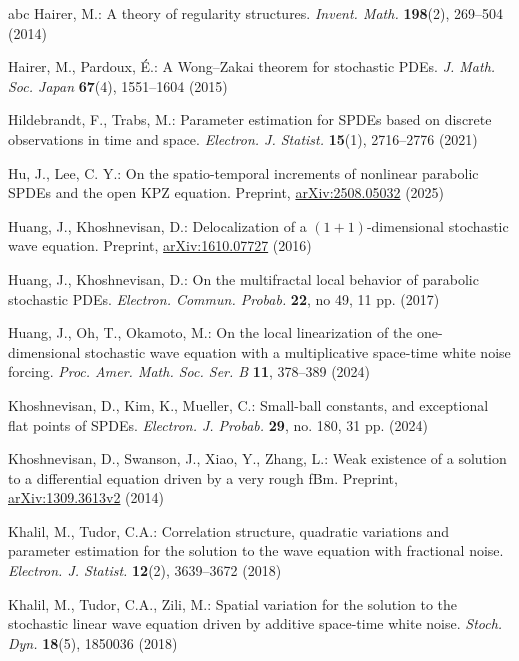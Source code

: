 \documentclass[11pt,reqno]{amsart}
\numberwithin{equation}{section}
\newcommand{\1}{{\bf 1}}
\newcommand{\2}{{\bf 2}}
\begin{document}
\begin{thebibliography}{abc}
Hairer, M.: A theory of regularity structures. \textit{Invent. Math.} \textbf{198}(2), 269--504 (2014)

Hairer, M., Pardoux, \'E.: A Wong–Zakai theorem for stochastic PDEs. \textit{J. Math. Soc. Japan} \textbf{67}(4), 1551--1604 (2015)

Hildebrandt, F., Trabs, M.: Parameter estimation for SPDEs based on discrete observations in time and space. 
\textit{Electron. J. Statist.} \textbf{15}(1), 2716--2776 (2021)

Hu, J., Lee, C. Y.: On the spatio-temporal increments of nonlinear parabolic SPDEs and the open KPZ equation. 
Preprint, \href{https://arxiv.org/pdf/2508.05032}{arXiv:2508.05032} (2025)

Huang, J., Khoshnevisan, D.: Delocalization of a $(1+1)$-dimensional stochastic wave equation. 
Preprint, \href{https://arxiv.org/abs/1610.07727}{arXiv:1610.07727} (2016)

Huang, J., Khoshnevisan, D.: On the multifractal local behavior of parabolic stochastic PDEs. 
\textit{Electron. Commun. Probab.} \textbf{22}, no 49, 11 pp. (2017)

Huang, J., Oh, T., Okamoto, M.: On the local linearization of the one-dimensional stochastic wave equation with a multiplicative space-time white noise forcing. 
\textit{Proc. Amer. Math. Soc. Ser. B} \textbf{11}, 378--389 (2024)

 

Khoshnevisan, D., Kim, K., Mueller, C.: Small-ball constants, and exceptional flat points of SPDEs. 
\textit{Electron. J. Probab.} \textbf{29}, no. 180, 31 pp. (2024)

Khoshnevisan, D., Swanson, J., Xiao, Y., Zhang, L.: Weak existence of a solution to a differential equation driven by a very rough fBm. 
Preprint, \href{https://arxiv.org/pdf/1309.3613.pdf}{arXiv:1309.3613v2} (2014)

 
Khalil, M., Tudor, C.A.: Correlation structure, quadratic variations and parameter estimation for the solution to the wave equation with fractional noise. 
\textit{Electron. J. Statist.} \textbf{12}(2), 3639--3672 (2018)

Khalil, M., Tudor, C.A., Zili, M.: Spatial variation for the solution to the stochastic linear wave equation driven by additive space-time white noise.  \textit{Stoch. Dyn.} \textbf{18}(5), 1850036 (2018)


\end{thebibliography}
\end{document}
